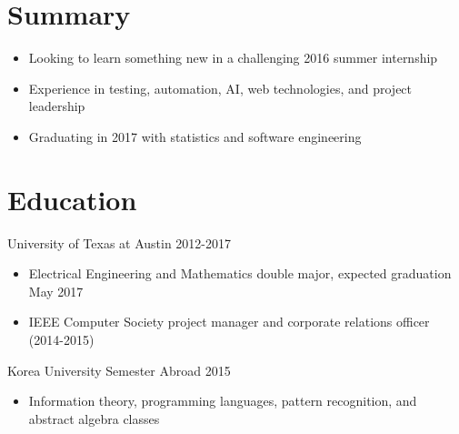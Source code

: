 \documentclass[line,margin]{res}
\begin{document}
    \address{10336 Kilmarnock Drive, Austin, TX 78726}
    \address{(512) 917-8236 |
    \href{mailto:jdong42@gmail.com}{jdong42@gmail.com}}

\begin{resume}

\vspace{-8pt}
\section{Summary}
    \vspace{22pt}
        \begin{itemize} \itemsep -2pt
        \item Looking to learn something new in a challenging 2016 summer internship
        \item Experience in testing, automation, AI, web technologies, and project leadership 
        \item Graduating in 2017 with statistics and software engineering
        \end{itemize}

   
\vspace{-8pt}
\section{Education} 
    \vspace{12pt}
    University of Texas at Austin \hfill 2012-2017 \\
    \vspace{-12pt}
        \begin{itemize} \itemsep -2pt
        \item Electrical Engineering and Mathematics double major, expected graduation May 2017
        \item IEEE Computer Society project manager and corporate relations officer (2014-2015)
        \end{itemize}
     
    \vspace{-6pt}
    Korea University Semester Abroad \hfill 2015 \\
    \vspace{-12pt}
        \begin{itemize} \itemsep -2pt
        \item Information theory, programming languages, pattern recognition, and abstract algebra classes
        \end{itemize}
  


\end{resume}
\end{document}
